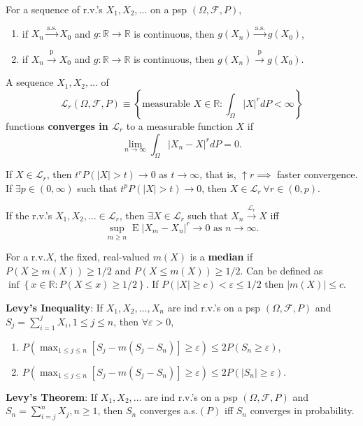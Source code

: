 \documentclass[paper=letter,fontsize=3mm]{scrartcl}
\DeclareMathOperator{\E}{E}
\newcommand{\convprob}{\stackrel{\text{p}}{\longrightarrow}}
\newcommand{\convas}{\stackrel{\text{a.s.}}{\longrightarrow}}
\newcommand{\convL}[1]{\stackrel{\mathcal{L}_{#1}}{\longrightarrow}}
\newcommand{\eps}{\varepsilon}
\newcommand{\R}{\mathbb{R}}
\newcommand\abs[1]{\left| #1 \right|}
\newcommand\set[1]{\left\{ #1 \right\}}
\begin{document}
\begin{multicols*}{3}
For a sequence of r.v.\@'s $X_1, X_2, \dots$ on a psp $(\Omega, \mathcal{F}, P)$,
\begin{enumerate}
\item if $X_n \convas X_0$  and $g: \R \to \R$ is continuous, then $g(X_n) \convas g(X_0)$,
\item if $X_n \convprob X_0$  and $g: \R \to \R$ is continuous, then $g(X_n) \convprob g(X_0)$.
\end{enumerate}

A sequence $X_1, X_2, \dots$ of 
$$\mathcal{L}_r(\Omega, \mathcal{F}, P) \equiv \set{\text{measurable } X \in \R: \int_\Omega \abs{X}^r dP < \infty}$$ 
functions \textbf{converges in $\mathcal{L}_r$} to a measurable function $X$ if 
$$\lim_{n\to\infty} \int_\Omega \abs{X_n - X}^r dP = 0.$$

If $X \in \mathcal{L}_r$, then $t^r P(\abs{X} > t) \to 0$ as $t \to \infty$, that is, $\uparrow r \implies$ faster convergence. If $\exists p \in (0,\infty)$ such that $t^p P(\abs{X} > t) \to 0$, then $X \in \mathcal{L}_r ~\forall r \in (0, p)$. \\\medskip

If the r.v.\@'s $X_1, X_2, \dots \in \mathcal{L}_r$, then $\exists X \in \mathcal{L}_r$ such that $X_n \convL{r} X$ iff 
$$\sup_{m\ge n} \E\abs{X_m-X_n}^r \to 0 \text{ as } n \to \infty.$$

For a r.v.\@ $X$, the fixed, real-valued $m(X)$ is a \textbf{median} if $P(X \ge m(X)) \ge 1/2$ and $P(X \le m(X)) \ge 1/2$. Can be defined as $\inf\set{x \in \R: P(X \le x) \ge 1/2}$. If $P(\abs{X} \ge c) < \eps \le 1/2$ then $\abs{m(X)} \le c$. \\\medskip

\textbf{Levy's Inequality}: If $X_1, X_2, \dots, X_n$ are ind r.v.\@'s on a psp $(\Omega, \mathcal{F}, P)$ and $S_j = \sum_{i=1}^j X_i, 1 \le j \le n$, then $\forall \eps > 0$,
\begin{enumerate}
\item $P\left( \max_{1\le j \le n}\left[ S_j - m(S_j-S_n)\right] \ge \eps\right) \le 2P(S_n \ge \eps)$,
\item $P\left( \max_{1\le j \le n}\left[ S_j - m(S_j-S_n)\right] \ge \eps\right) \le 2P(\abs{S_n} \ge \eps)$.
\end{enumerate}

\textbf{Levy's Theorem}: If $X_1, X_2, \dots$ are ind r.v.\@'s on a psp $(\Omega, \mathcal{F}, P)$ and  $S_n = \sum_{i=j}^n X_j, n\ge1$, then $S_n$ converges a.s.$(P)$ iff $S_n$ converges in probability. \\\medskip


\end{multicols*}
\end{document}
